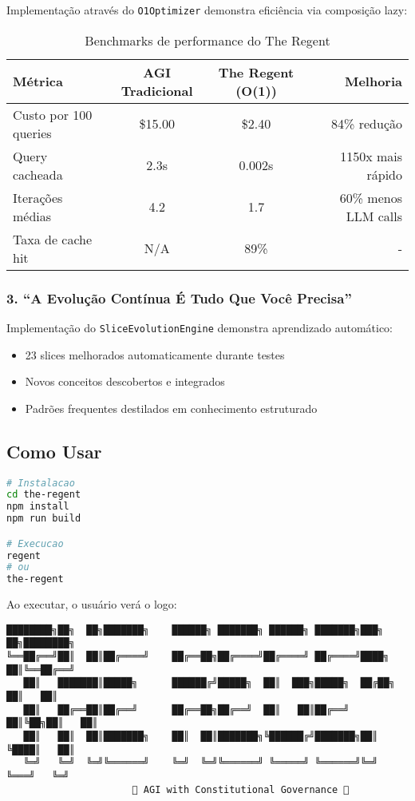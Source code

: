 \documentclass[11pt]{article}
\begin{document}
Implementação através do \texttt{O1Optimizer} demonstra eficiência via composição lazy:

\begin{table}[H]
\centering
\begin{tabular}{@{}lccr@{}}
\toprule
\textbf{Métrica} & \textbf{AGI Tradicional} & \textbf{The Regent (O(1))} & \textbf{Melhoria} \\ \midrule
Custo por 100 queries & \$15.00 & \$2.40 & 84\% redução \\
Query cacheada & 2.3s & 0.002s & 1150x mais rápido \\
Iterações médias & 4.2 & 1.7 & 60\% menos LLM calls \\
Taxa de cache hit & N/A & 89\% & - \\
\bottomrule
\end{tabular}
\caption{Benchmarks de performance do The Regent}
\end{table}

\subsubsection{3. ``A Evolução Contínua É Tudo Que Você Precisa''}

Implementação do \texttt{SliceEvolutionEngine} demonstra aprendizado automático:

\begin{itemize}
    \item 23 slices melhorados automaticamente durante testes
    \item Novos conceitos descobertos e integrados
    \item Padrões frequentes destilados em conhecimento estruturado
\end{itemize}

\subsection{Como Usar}

\begin{lstlisting}[language=bash]
# Instalacao
cd the-regent
npm install
npm run build

# Execucao
regent
# ou
the-regent
\end{lstlisting}

Ao executar, o usuário verá o logo:

\begin{verbatim}
████████╗██╗  ██╗███████╗    ██████╗ ███████╗ ██████╗ ███████╗███╗   ██╗████████╗
╚══██╔══╝██║  ██║██╔════╝    ██╔══██╗██╔════╝██╔════╝ ██╔════╝████╗  ██║╚══██╔══╝
   ██║   ███████║█████╗      ██████╔╝█████╗  ██║  ███╗█████╗  ██╔██╗ ██║   ██║
   ██║   ██╔══██║██╔══╝      ██╔══██╗██╔══╝  ██║   ██║██╔══╝  ██║╚██╗██║   ██║
   ██║   ██║  ██║███████╗    ██║  ██║███████╗╚██████╔╝███████╗██║ ╚████║   ██║
   ╚═╝   ╚═╝  ╚═╝╚══════╝    ╚═╝  ╚═╝╚══════╝ ╚═════╝ ╚══════╝╚═╝  ╚═══╝   ╚═╝
                      👑 AGI with Constitutional Governance 👑
\end{verbatim}
\end{document}
